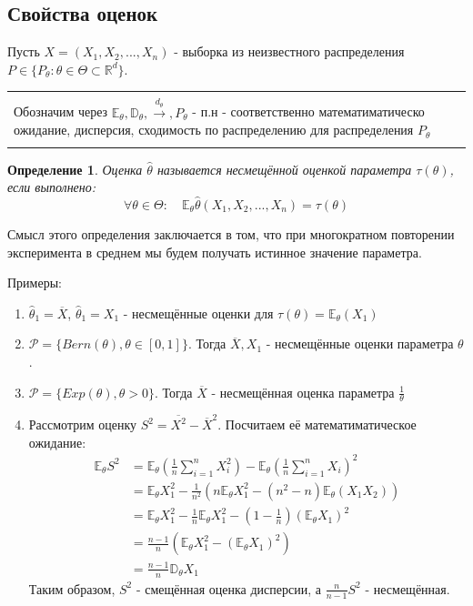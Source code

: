 \documentclass[a4paper,12pt]{article}
\newcommand{\expec}{\mathbb{E}}
\newcommand{\disp}{\mathbb{D}}
\newcommand{\dconvt}{\overset{d_{\theta}}{\to}}
\newcommand{\sumin}{\sum\limits_{i=1}^n}
\newcommand{\sample}{X_1, X_2, ..., X_n}
\newcommand{\gendis}{P \in \{ P_\theta : \theta \in \Theta \subset \R^d\}}
\newcommand{\R}{\mathbb{R}}
\newenvironment{annotation}{\begin{center}
    \begin{tabular}{|p{0.9\textwidth}|}
    \hline\\
}
{ 
    \\\\\hline
    \end{tabular} 
    \end{center}
}
\newtheorem{dfn}{Определение}[section]
\theoremstyle{named}
\begin{document}
\subsection{Свойства оценок}
Пусть $X = (\sample)$ - выборка из неизвестного распределения $\gendis$. 

\begin{annotation}
Обозначим через $\expec{}_\theta, \disp{}_\theta, \dconvt, P_\theta$
 - п.н - соответственно математиматическо ожидание, дисперсия, сходимость по распределению для распределения $P_\theta$
\end{annotation}

\begin{dfn}
    Оценка $\hat\theta$ называется несмещённой оценкой параметра $\tau(\theta)$, если выполнено:
    $$
        \forall \theta \in \Theta: \quad \expec_\theta \hat\theta(\sample) = \tau(\theta)
    $$
\end{dfn}
Смысл этого определения заключается в том, что при многократном повторении эксперимента в среднем мы будем получать истинное значение 
параметра.


Примеры:
\begin{enumerate}
    \item $\hat\theta_1 = \overline{X}$, $\hat\theta_1 = X_1$ - несмещённые оценки для $\tau(\theta) = \expec_\theta(X_1)$
    \item $\mathcal{P} = \{ Bern(\theta), \theta \in [0, 1] \}$. Тогда $\overline{X}, X_1$ - несмещённые оценки параметра $\theta$.
    \item $\mathcal{P} = \{ Exp(\theta), \theta > 0 \}$. Тогда $\overline{X}$ - несмещённая оценка параметра $\frac{1}{\theta}$
    \item Рассмотрим оценку $S^2 = \overline{X^2} - \overline{X}^2$. Посчитаем её математиматическое ожидание:
    \begin{equation}
        \begin{split}
        \expec_\theta S^2 &= \expec_\theta\left(\frac{1}{n}\sumin X_i^2\right) - \expec_\theta\left(\frac{1}{n}\sumin X_i\right)^2 \\ 
        &=\expec_\theta X_1^2 - \frac{1}{n^2}\left(n\expec_\theta X_1^2 - (n^2 - n)\expec_\theta(X_1X_2)\right)  \\
        &=\expec_\theta X_1^2 - \frac{1}{n}\expec_\theta X_1^2 - \left(1 - \frac{1}{n}\right)(\expec_\theta X_1) ^2 \\
        &= \frac{n-1}{n}\left(\expec_\theta X_1^2 - \left(\expec_\theta X_1\right)^2 \right)\\
        &= \frac{n-1}{n}\disp_\theta X_1    
        \end{split}
    \end{equation}
    Таким образом, $S^2$ - смещённая оценка дисперсии, а $\frac{n}{n-1}S^2$ - несмещённая.
\end{enumerate}
\end{document}
